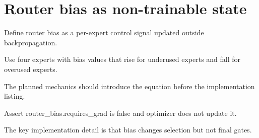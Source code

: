 \section{Router bias as non-trainable state}
\label{sec:ch09-router-bias-as-non-trainable-state}

Define router bias as a per-expert control signal updated outside backpropagation.



Use four experts with bias values that rise for underused experts and fall for overused experts.



The planned mechanics should introduce the equation before the implementation listing.





\begin{checkpointbox}
Assert router\_bias.requires\_grad is false and optimizer does not update it.
\end{checkpointbox}

The key implementation detail is that bias changes selection but not final gates.
